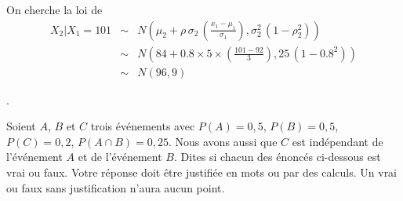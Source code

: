 \begin{questions}
\begin{solution}
On cherche la loi de
		\begin{eqnarray*}
			{X}_2|{X}_1=101 &\sim& N\left(\mu_2 +\rho\, \sigma_2\, \left(\frac{x_1-\mu_1}{\sigma_1}\right),\sigma_2^2 \,\left(1-\rho_2^2\right)\right)\\
			&\sim& N\left(84 +0.8\times 5\times \left(\frac{101-92}{3}\right),25 \,\left(1-0.8^2\right)\right)\\
			&\sim& N\left(96, 9 \right)
	\end{eqnarray*}
\end{solution}


\newpage . \newpage


\question\label{pa} Soient $A$, $B$ et $C$ trois événements avec $P(A)=0,5$, $P(B)=0,5$, $P(C)=0,2$, $P(A\cap B)=0,25$. Nous avons aussi que $C$ est indépendant de l'événement $A$ et de l'événement $B$. Dites si chacun des énoncés ci-dessous est vrai ou faux. Votre réponse doit être justifiée en mots ou par des calculs. Un vrai ou faux sans justification n'aura aucun point.

\vspace{0.5cm}
\end{questions}
